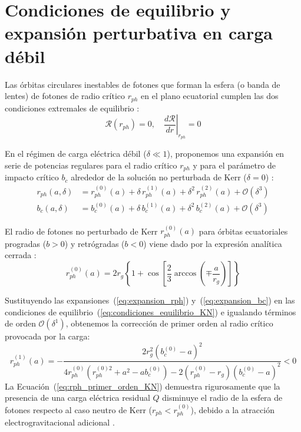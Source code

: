 \section{Condiciones de equilibrio y expansión perturbativa en carga débil}
Las órbitas circulares inestables de fotones que forman la esfera (o banda de lentes) de fotones de radio crítico $r_{ph}$ en el plano ecuatorial cumplen las dos condiciones extremales de equilibrio \citep{fhoton_bh, prueba_bh_cargado}:
\begin{equation}
    \mathcal{R}(r_{ph}) = 0, \quad \left. \frac{d\mathcal{R}}{dr} \right|_{r_{ph}} = 0
    \label{eq:condiciones_equilibrio_KN}
\end{equation}

En el régimen de carga eléctrica débil ($\delta \ll 1$), proponemos una expansión en serie de potencias regulares para el radio crítico $r_{ph}$ y para el parámetro de impacto crítico $b_c$ alrededor de la solución no perturbada de Kerr ($\delta = 0$) \citep{Ali-H.-Nayfeh-Introduction-to-perturbation-techniques-1993-Wiley-VCH, TFG-G7513}:
\begin{align}
    r_{ph}(a, \delta) &= r_{ph}^{(0)}(a) + \delta \, r_{ph}^{(1)}(a) + \delta^2 \, r_{ph}^{(2)}(a) + \mathcal{O}(\delta^3) \label{eq:expansion_rph} \\
    b_c(a, \delta) &= b_c^{(0)}(a) + \delta \, b_c^{(1)}(a) + \delta^2 \, b_c^{(2)}(a) + \mathcal{O}(\delta^3) \label{eq:expansion_bc}
\end{align}

El radio de fotones no perturbado de Kerr $r_{ph}^{(0)}(a)$ para órbitas ecuatoriales progradas ($b > 0$) y retrógradas ($b < 0$) viene dado por la expresión analítica cerrada \citep{Hobson, Achour_2025_J._Cosmol._Astropart._Phys._2025_012}:
\begin{equation}
    r_{ph}^{(0)}(a) = 2 r_g \left\{ 1 + \cos \left[ \frac{2}{3} \arccos \left( \mp \frac{a}{r_g} \right) \right] \right\}
    \label{eq:rph_kerr_exacto}
\end{equation}

Sustituyendo las expansiones~(\ref{eq:expansion_rph}) y~(\ref{eq:expansion_bc}) en las condiciones de equilibrio~(\ref{eq:condiciones_equilibrio_KN}) e igualando términos de orden $\mathcal{O}(\delta^1)$, obtenemos la corrección de primer orden al radio crítico provocada por la carga:
\begin{equation}
    r_{ph}^{(1)}(a) = -\frac{2 r_g^2 \left( b_c^{(0)} - a \right)^2}{4 r_{ph}^{(0)} \left( r_{ph}^{(0)2} + a^2 - a b_c^{(0)} \right) - 2 \left( r_{ph}^{(0)} - r_g \right) \left( b_c^{(0)} - a \right)^2} < 0
    \label{eq:rph_primer_orden_KN}
\end{equation}
La Ecuación~(\ref{eq:rph_primer_orden_KN}) demuestra rigurosamente que la presencia de una carga eléctrica residual $Q$ disminuye el radio de la esfera de fotones respecto al caso neutro de Kerr ($r_{ph} < r_{ph}^{(0)}$), debido a la atracción electrogravitacional adicional \citep{Heydarzade_2024}.


